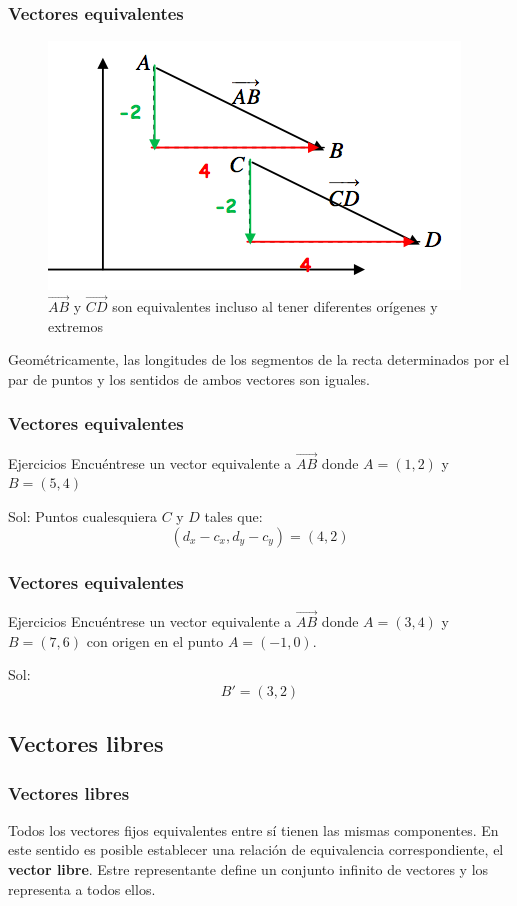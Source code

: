 \documentclass{beamer}
\begin{document}
\begin{frame}
  \frametitle{Vectores equivalentes}
\begin{figure}[h]
    \label{fig:vectores equivalentes}
\centering
\includegraphics[scale=0.2]{vectors_equivalents}
\caption{$\vec{AB}$ y $\vec{CD}$ son equivalentes incluso al tener diferentes or\'igenes y extremos}

\end{figure}

Geom\'etricamente, las longitudes de los segmentos de la recta determinados por el par de puntos y los sentidos de ambos vectores son iguales.
\end{frame}


\begin{frame}
  \frametitle{Vectores equivalentes}
  \begin{block}{Ejercicios}
Encu\'entrese un vector equivalente a $\vec{AB}$ donde $A=(1,2)$ y $B=(5,4)$
\end{block}
Sol: Puntos cualesquiera $C$ y $D$ tales que:
\[(d_x-c_x,d_y-c_y) = (4,2)\]
\end{frame}

\begin{frame}
  \frametitle{Vectores equivalentes}
  \begin{block}{Ejercicios}
Encu\'entrese un vector equivalente a $\vec{AB}$ donde $A=(3,4)$ y $B=(7,6)$ con origen en el punto $A=(-1,0)$.
\end{block}
Sol: 
\[B'=(3,2)\]
\end{frame}




\subsection{Vectores libres}
\begin{frame}
  \frametitle{Vectores libres}

Todos los vectores fijos equivalentes entre s\'i tienen las mismas componentes. En este sentido es posible establecer una relaci\'on de equivalencia correspondiente, el \textbf{vector libre}. Estre representante define un conjunto infinito de vectores y los representa a todos ellos.


\end{frame}
\end{document}
